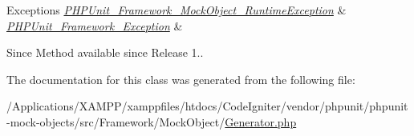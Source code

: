 \begin{DoxyExceptions}{Exceptions}
{\em \mbox{\hyperlink{class_p_h_p_unit___framework___mock_object___runtime_exception}{P\+H\+P\+Unit\+\_\+\+Framework\+\_\+\+Mock\+Object\+\_\+\+Runtime\+Exception}}} & \\
\hline
{\em \mbox{\hyperlink{class_p_h_p_unit___framework___exception}{P\+H\+P\+Unit\+\_\+\+Framework\+\_\+\+Exception}}} & \\
\hline
\end{DoxyExceptions}
\begin{DoxySince}{Since}
Method available since Release 1.. 
\end{DoxySince}


The documentation for this class was generated from the following file\+:\begin{DoxyCompactItemize}
\item 
/\+Applications/\+X\+A\+M\+P\+P/xamppfiles/htdocs/\+Code\+Igniter/vendor/phpunit/phpunit-\/mock-\/objects/src/\+Framework/\+Mock\+Object/\mbox{\hyperlink{_generator_8php}{Generator.\+php}}\end{DoxyCompactItemize}
